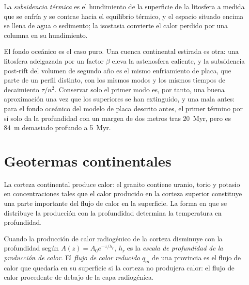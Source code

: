 \begin{definition}\label{def:b3:lithosphere-thermal-models:thermal-subsidence}
La \emph{subsidencia térmica} es el hundimiento de la
superficie de la litosfera a medida que se enfría y se contrae hacia el
equilibrio térmico, y el espacio situado encima se llena de agua o sedimento;
la isostasia convierte el calor perdido por una columna en su hundimiento.
\end{definition}

El fondo oceánico es el caso puro. Una cuenca continental estirada es otra: una
litosfera adelgazada por un factor $\beta$ eleva la astenosfera caliente, y la
subsidencia post-rift del volumen de segundo año es el mismo enfriamiento de placa, que parte
de un perfil distinto, con los mismos modos y los mismos tiempos de decaimiento $\tau/n^2$.
Conservar solo el primer modo es, por tanto, una buena aproximación una vez que los superiores
se han extinguido, y una mala antes: para el fondo oceánico del modelo de placa
descrito antes, el primer término por sí solo da la profundidad con un margen de dos metros tras
\qty{20}{Myr}, pero es \qty{84}{m} demasiado profundo a \qty{5}{Myr}.

\section{Geotermas continentales}

La corteza continental produce calor: el granito contiene uranio, torio y potasio en
concentraciones tales que el calor producido en la corteza superior constituye una parte importante del
flujo de calor en la superficie. La forma en que se distribuye la producción con la profundidad
determina la temperatura en profundidad.

\begin{definition}\label{def:b3:lithosphere-thermal-models:reduced}
Cuando la producción de calor radiogénico de la corteza disminuye con la profundidad según
$A(z) = A_0e^{-z/h_r}$, $h_r$ es la \emph{escala de profundidad de la
producción de calor}. El \emph{flujo de
calor reducido} $q_m$ de una provincia es el flujo de calor que
quedaría en su superficie si la corteza no produjera calor: el flujo de calor procedente de
debajo de la capa radiogénica.
\end{definition}

